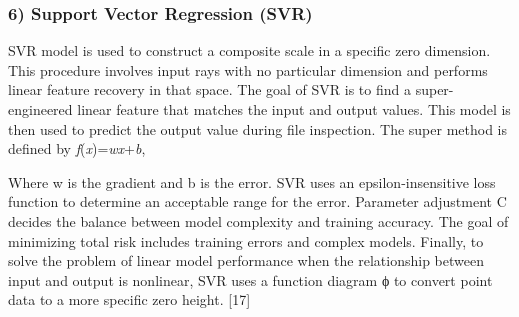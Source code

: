 \documentclass[conference]{IEEEtran}
\begin{document}
{\subsubsection*{\textbf{6) Support Vector Regression (SVR)}}
SVR model is used to construct a composite scale in a specific zero dimension. This procedure involves input rays with no particular dimension and performs linear feature recovery in that space. The goal of SVR is to find a super-engineered linear feature that matches the input and output values. This model is then used to predict the output value during file inspection. The super method is defined by \textit{f}(\textit{x})=\textit{wx}+\textit{b}, 

Where w is the gradient and b is the error. SVR uses an epsilon-insensitive loss function to determine an acceptable range for the error. Parameter adjustment C decides the balance between model complexity and training accuracy. The goal of minimizing total risk includes training errors and complex models. Finally, to solve the problem of linear model performance when the relationship between input and output is nonlinear, SVR uses a function diagram ϕ to convert point data to a more specific zero height. [17]

}
\end{document}
